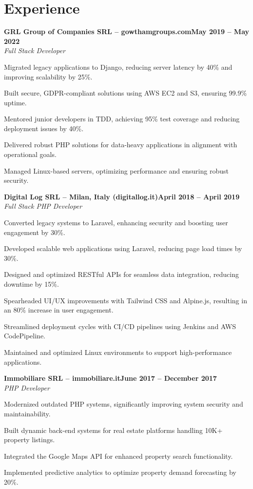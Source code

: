 \documentclass[letterpaper,10pt]{article}
\newcommand{\heading}[2]{
  \hspace{10pt}#1\hfill#2\\
}
\newcommand{\headingBf}[2]{
  \heading{\textbf{#1}}{\textbf{#2}}
}
\newcommand{\headingIt}[2]{
  \heading{\textit{#1}}{\textit{#2}}
}
\newenvironment{resume_list}{
  \vspace{-7pt}
  \begin{itemize}[itemsep=-2px, parsep=1pt, leftmargin=30pt]
}{
  \end{itemize}
}
\begin{document}

  \section{Experience}

  \headingBf{GRL Group of Companies SRL -- gowthamgroups.com}{May 2019 -- May 2022}
  \headingIt{Full Stack Developer}{}
  \begin{resume_list}
    \item Migrated legacy applications to Django, reducing server latency by 40\% and improving scalability by 25\%.
    \item Built secure, GDPR-compliant solutions using AWS EC2 and S3, ensuring 99.9\% uptime.
    \item Mentored junior developers in TDD, achieving 95\% test coverage and reducing deployment issues by 40\%.
    \item Delivered robust PHP solutions for data-heavy applications in alignment with operational goals.
    \item Managed Linux-based servers, optimizing performance and ensuring robust security.
  \end{resume_list}

  \headingBf{Digital Log SRL -- Milan, Italy (digitallog.it)}{April 2018 -- April 2019}
  \headingIt{Full Stack PHP Developer}{}
  \begin{resume_list}
    \item Converted legacy systems to Laravel, enhancing security and boosting user engagement by 30\%.
    \item Developed scalable web applications using Laravel, reducing page load times by 30\%.
    \item Designed and optimized RESTful APIs for seamless data integration, reducing downtime by 15\%.
    \item Spearheaded UI/UX improvements with Tailwind CSS and Alpine.js, resulting in an 80\% increase in user engagement.
    \item Streamlined deployment cycles with CI/CD pipelines using Jenkins and AWS CodePipeline.
    \item Maintained and optimized Linux environments to support high-performance applications.
  \end{resume_list}

  \headingBf{Immobiliare SRL -- immobiliare.it}{June 2017 -- December 2017}
  \headingIt{PHP Developer}{}
  \begin{resume_list}
    \item Modernized outdated PHP systems, significantly improving system security and maintainability.
    \item Built dynamic back-end systems for real estate platforms handling 10K+ property listings.
    \item Integrated the Google Maps API for enhanced property search functionality.
    \item Implemented predictive analytics to optimize property demand forecasting by 20\%.
  \end{resume_list}
\end{document}
